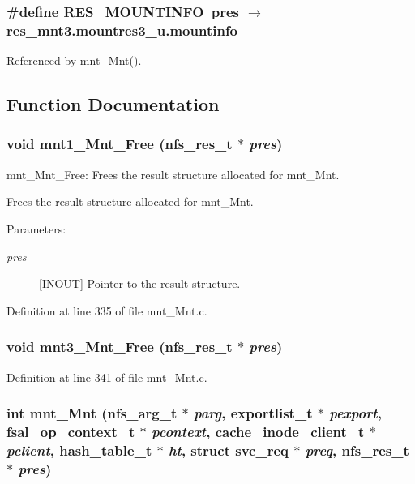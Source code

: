 \subsubsection{\setlength{\rightskip}{0pt plus 5cm}\#define RES\_\-MOUNTINFO\ pres $\rightarrow$ res\_\-mnt3.mountres3\_\-u.mountinfo}\label{mnt__Mnt_8c_a0}




Referenced by mnt\_\-Mnt().

\subsection{Function Documentation}
\subsubsection{\setlength{\rightskip}{0pt plus 5cm}void mnt1\_\-Mnt\_\-Free (nfs\_\-res\_\-t $\ast$ {\em pres})}\label{mnt__Mnt_8c_a2}


mnt\_\-Mnt\_\-Free: Frees the result structure allocated for mnt\_\-Mnt.

Frees the result structure allocated for mnt\_\-Mnt.

\begin{Desc}
\item[Parameters:]
\begin{description}
\item[{\em pres}][INOUT] Pointer to the result structure. \end{description}
\end{Desc}


Definition at line 335 of file mnt\_\-Mnt.c.
\subsubsection{\setlength{\rightskip}{0pt plus 5cm}void mnt3\_\-Mnt\_\-Free (nfs\_\-res\_\-t $\ast$ {\em pres})}\label{mnt__Mnt_8c_a3}




Definition at line 341 of file mnt\_\-Mnt.c.
\subsubsection{\setlength{\rightskip}{0pt plus 5cm}int mnt\_\-Mnt (nfs\_\-arg\_\-t $\ast$ {\em parg}, exportlist\_\-t $\ast$ {\em pexport}, fsal\_\-op\_\-context\_\-t $\ast$ {\em pcontext}, cache\_\-inode\_\-client\_\-t $\ast$ {\em pclient}, hash\_\-table\_\-t $\ast$ {\em ht}, struct svc\_\-req $\ast$ {\em preq}, nfs\_\-res\_\-t $\ast$ {\em pres})}\label{mnt__Mnt_8c_a1}


